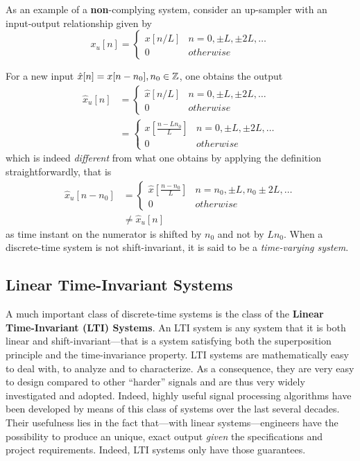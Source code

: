 \documentclass[\documentfontsize, twocolumn]{\classname}
\begin{document}
As an example of a \textbf{non}-complying system, consider an up-sampler with an input-output relationship given by
\[
	x_u[n] =
	\left\{
		\begin{array}{ll}
			x[n/L] 	& n=0,\pm L, \pm 2L, \dots \\
			0 	& otherwise
		\end{array}
	\right.
\]

For a new input $\hat x[n] = x[n-n_0], n_0 \in \mathbb Z$, one obtains the output
\begin{align*}
    \hat x_u[n] &=
	\left\{
		\begin{array}{ll}
			\hat x[n/L] 	& n=0,\pm L, \pm 2L, \dots \\
			0 	& otherwise
		\end{array}
	\right.\\
                &=
    \left\{
		\begin{array}{ll}
            x[\frac{n-Ln_0}{L}] 	& n=0,\pm L, \pm 2L, \dots \\
			0 	& otherwise
		\end{array}
	\right.
\end{align*}
which is indeed \emph{different} from what one obtains by applying the definition straightforwardly, that is
\begin{align*}
    \hat x_u[n-n_0] &=
	\left\{
		\begin{array}{ll}
            \hat x[\frac{n-n_0}{L}] 	& n=n_0,\pm L,n_0 \pm 2L, \dots \\
			0 	& otherwise
		\end{array}
	\right.\\
                    &\neq \hat x_u[n]
\end{align*}
as time instant on the numerator is shifted by $n_0$ and not by $Ln_0$. When a discrete-time system is not shift-invariant, it is said to be a \emph{time-varying system}.

\subsection{Linear Time-Invariant Systems}\label{sec:ltiSystems}

A much important class of discrete-time systems is the class of the \textbf{Linear Time-Invariant (LTI) Systems}. An LTI system is any system that it is both linear and shift-invariant---that is a system satisfying both the superposition principle and the time-invariance property. LTI systems are mathematically easy to deal with, to analyze and to characterize. As a consequence, they are very easy to design compared to other ``harder'' signals and are thus very widely investigated and adopted. Indeed, highly useful signal processing algorithms have been developed by means of this class of systems over the last several decades. Their usefulness lies in the fact that---with linear systems---engineers have the possibility to produce an unique, exact output \emph{given} the specifications and project requirements. Indeed, LTI systems only have those guarantees.
\end{document}

